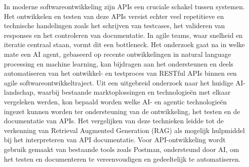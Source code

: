 In moderne softwareontwikkeling zijn APIs een cruciale schakel tussen systemen. Het ontwikkelen en testen van deze APIs vereist echter veel repetitieve en technische handelingen zoals het schrijven van testcases, het valideren van responses en het controleren van documentatie. In agile teams, waar snelheid en iteratie centraal staan, vormt dit een bottleneck. Het onderzoek gaat na in welke mate een AI agent, gebaseerd op recente ontwikkelingen in natural language processing en machine learning, kan bijdragen aan het ondersteunen en deels automatiseren van het ontwikkel- en testproces van RESTful APIs binnen een agile softwareontwikkeltraject. Uit een uitgebreid onderzoek naar het huidige AI-landschap, waarbij bestaande marktoplossingen en technologieën met elkaar vergeleken werden, kon bepaald worden welke AI- en agentic technologieën ingezet kunnen worden ter ondersteuning van de ontwikkeling, het testen en de documentatie van APIs. Het vergelijken van deze technieken leidde tot de verkenning van Retrieval Augmented Generation (RAG) als mogelijk hulpmiddel bij het interpreteren van API documentatie. Voor API-ontwikkeling wordt gebruik gemaakt van bestaande tools zoals Postman, ondersteund door AI, om het testen en documenteren te vereenvoudigen en gedeeltelijk te automatiseren.

